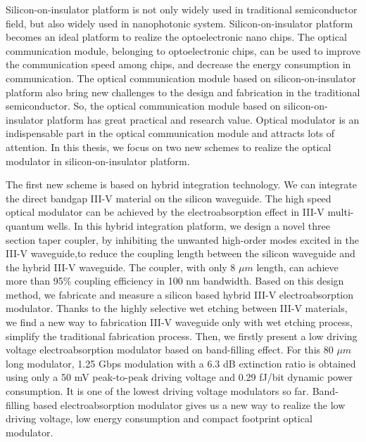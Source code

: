 \begin{englishabstract}
Silicon-on-insulator platform is not only widely used in traditional semiconductor field, but also widely used in nanophotonic system. Silicon-on-insulator platform becomes an ideal platform to realize the optoelectronic nano chips. The optical communication module, belonging to optoelectronic chips, can be used to improve the communication speed among chips, and decrease the energy consumption in communication. The optical communication module based on silicon-on-insulator platform also bring new challenges to the design and fabrication in the traditional semiconductor. So, the optical communication module based on silicon-on-insulator platform has great practical and research value. Optical modulator is an indispensable part in the optical communication module and attracts lots of attention. In this thesis, we focus on two new schemes to realize the optical modulator in silicon-on-insulator platform.

The first new scheme is based on hybrid integration technology. We can integrate the direct bandgap III-V material on the silicon waveguide. The high speed optical modulator can be achieved by the electroabsorption effect in III-V multi-quantum wells. In this hybrid integration platform, we design a novel three section taper coupler, by inhibiting the unwanted high-order modes excited in the III-V waveguide,to reduce the coupling length between the silicon waveguide and the hybrid III-V waveguide. The coupler, with only 8 $\mu m$ length, can achieve more than 95\% coupling efficiency in 100 nm bandwidth. Based on this design method, we fabricate and measure a silicon based hybrid III-V electroabsorption modulator. Thanks to the highly selective wet etching between III-V materials, we find a new way to fabrication III-V waveguide only with wet etching process, simplify the traditional  fabrication process. Then, we firstly present a low driving voltage electroabsorption modulator based on band-filling effect. For this 80 $\mu m$ long modulator, 1.25 Gbps modulation with a 6.3 dB extinction ratio is obtained using only a 50 mV peak-to-peak driving voltage and 0.29 fJ/bit dynamic power consumption. It is one of the lowest driving voltage modulators so far. Band-filling based electroabsorption modulator gives us a new way to realize the low driving voltage, low energy consumption and compact footprint optical modulator.


\end{englishabstract}
